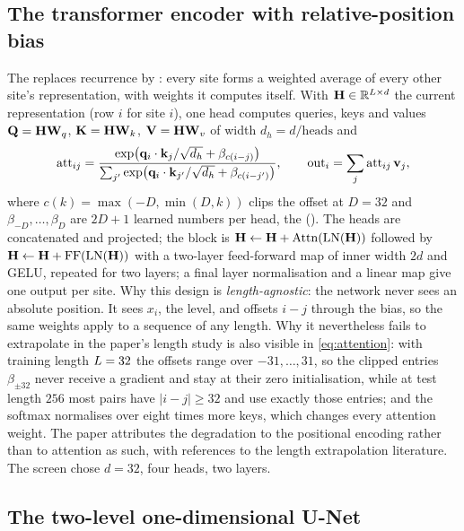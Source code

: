 \subsection{The transformer encoder with relative-position bias}

The  replaces recurrence by : every site forms a
weighted average of every other site's representation, with weights it computes
itself. With $\mathbf{H}\in\mathbb{R}^{L\times d}$ the current representation (row $i$ for
site $i$), one head computes queries, keys and values $\mathbf{Q}=\mathbf{H}\mathbf{W}_q$,
$\mathbf{K}=\mathbf{H}\mathbf{W}_k$, $\mathbf{V}=\mathbf{H}\mathbf{W}_v$ of width $d_h=d/\text{heads}$ and
\begin{equation}
  \mathrm{att}_{ij}=\frac{\exp\bigl(\mathbf{q}_i\cdot\mathbf{k}_j/\sqrt{d_h}+\beta_{c(i-j)}\bigr)}{\sum_{j'}\exp\bigl(\mathbf{q}_i\cdot\mathbf{k}_{j'}/\sqrt{d_h}+\beta_{c(i-j')}\bigr)},
  \qquad
  \mathrm{out}_i=\sum_j\mathrm{att}_{ij}\,\mathbf{v}_j ,
  \label{eq:attention}
\end{equation}
where $c(k)=\max(-D,\min(D,k))$ clips the offset at $D=32$ and $\beta_{-D},\dots,\beta_D$
are $2D+1$ learned numbers per head, the 
(). The heads are concatenated and projected; the block is
$\mathbf{H}\leftarrow\mathbf{H}+\mathrm{Attn}(\mathrm{LN}(\mathbf{H}))$ followed by
$\mathbf{H}\leftarrow\mathbf{H}+\mathrm{FF}(\mathrm{LN}(\mathbf{H}))$ with a two-layer feed-forward
map of inner width $2d$ and GELU, repeated for two layers; a final layer normalisation
and a linear map give one output per site. Why this design is \emph{length-agnostic}:
the network never sees an absolute position. It sees $x_i$, the level, and offsets
$i-j$ through the bias, so the same weights apply to a sequence of any length. Why it
nevertheless fails to extrapolate in the paper's length study is also visible in
\cref{eq:attention}: with training length $L=32$ the offsets range over
$-31,\dots,31$, so the clipped entries $\beta_{\pm32}$ never receive a gradient and stay
at their zero initialisation, while at test length $256$ most pairs have $|i-j|\ge32$
and use exactly those entries; and the softmax normalises over eight times more keys,
which changes every attention weight. The paper attributes the degradation to the
positional encoding rather than to attention as such, with references to the length
extrapolation literature. The screen chose $d=32$, four heads, two layers.

\subsection{The two-level one-dimensional U-Net}

